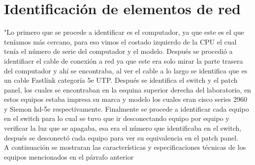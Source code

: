 \documentclass{udpreport}
\begin{document}
	\section{Identificación de elementos de red}
		"Lo primero que se procede a identificar es el computador, ya que este es el que teníamos más cercano, para eso vimos 		el costado izquierdo de la CPU el cual tenía el número de serie del computador y el modelo. Después se procedió a identifiacr 		el cable de conexión a red ya que este era solo mirar la parte trasera del computador y ahí se encontraba, al ver el cable 		a lo largo se identifica que es un cable Fastlink categoría 5e UTP. Después se identifica el switch y el patch panel, los 		cuales se encontraban en la esquina superior derecha del laboratorio, en estos equipos estaba impresa su marca y modelo 		los cuales eran cisco series 2960 y Siemon hd-5e respectivamente. Finalmente se procede a identificar cada equipo en 			el switch para lo cual se tuvo que ir desconectando equipo por equipo y verificar la luz que se apagaba, esa era el 		número que identificaba en el switch, después se desconectó cada equipo para ver su equivalencia en el patch panel.\\
		A continuación se mostraran las características y especificaciones técnicas de los equipos mencionados en el párrafo 			anterior\\
\end{document}

